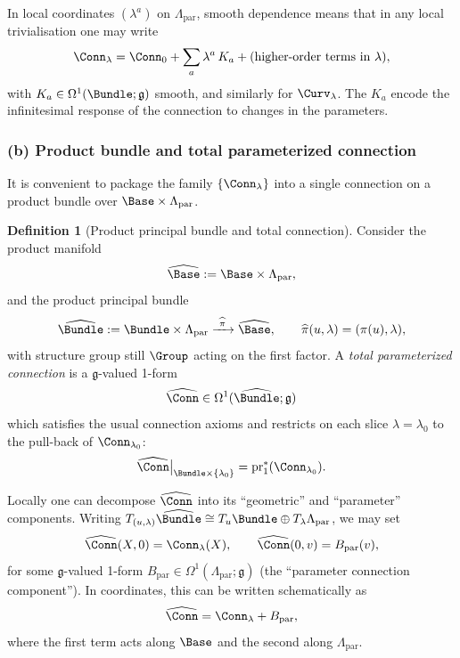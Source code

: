 \documentclass[11pt]{book}
\theoremstyle{plain}
\theoremstyle{definition}
\newtheorem{definition}[theorem]{Definition} \theoremstyle{remark}
\begin{document}
In local coordinates $(\lambda^a)$ on $\Lambda_{\mathrm{par}}$, smooth
dependence means that in any local trivialisation one may write
\[
   \Conn_\lambda
   =
   \Conn_0
   + \sum_a \lambda^a\,K_a
   + \text{(higher-order terms in }\lambda),
\]
with $K_a\in\Omega^1(\Bundle;\mathfrak{g})$ smooth, and similarly for
$\Curv_\lambda$. The $K_a$ encode the infinitesimal response of the
connection to changes in the parameters.



\subsubsection*{(b) Product bundle and total parameterized connection}

It is convenient to package the family $\{\Conn_\lambda\}$ into a single
connection on a product bundle over $\Base\times\Lambda_{\mathrm{par}}$.

\begin{definition}[Product principal bundle and total connection]
Consider the product manifold
  \[
     \widehat{\Base}
     :=
     \Base\times\Lambda_{\mathrm{par}},
  \]
  and the product principal bundle
  \[
     \widehat{\Bundle}
     :=
     \Bundle\times\Lambda_{\mathrm{par}}
     \xrightarrow{\ \widehat{\pi}\ }
     \widehat{\Base},
     \qquad
     \widehat{\pi}(u,\lambda)
     =
     (\pi(u),\lambda),
  \]
  with structure group still $\Group$ acting on the first factor. A
  \emph{total parameterized connection} is a $\mathfrak{g}$-valued
  1-form
  \[
     \widehat{\Conn}
     \in
     \Omega^1(\widehat{\Bundle};\mathfrak{g})
  \]
  which satisfies the usual connection axioms and restricts on each
  slice $\lambda=\lambda_0$ to the pull-back of $\Conn_{\lambda_0}$:
  \[
     \widehat{\Conn}\big|_{\Bundle\times\{\lambda_0\}}
     =
     \mathrm{pr}_1^*(\Conn_{\lambda_0}).
  \]
\end{definition}

Locally one can decompose $\widehat{\Conn}$ into its “geometric” and
“parameter” components. Writing $T_{(u,\lambda)}\widehat{\Bundle}
\cong T_u\Bundle\oplus T_\lambda\Lambda_{\mathrm{par}}$, we may set
\[
   \widehat{\Conn}(X,0) = \Conn_\lambda(X),\qquad
   \widehat{\Conn}(0,v) = B_{\mathrm{par}}(v),
\]
for some $\mathfrak{g}$-valued 1-form
$B_{\mathrm{par}}\in\Omega^1(\Lambda_{\mathrm{par}};\mathfrak{g})$
(the “parameter connection component”). In coordinates, this can be
written schematically as
\[
   \widehat{\Conn}
   =
   \Conn_\lambda
   + B_{\mathrm{par}},
\]
where the first term acts along $\Base$ and the second along
$\Lambda_{\mathrm{par}}$.
\end{document}
